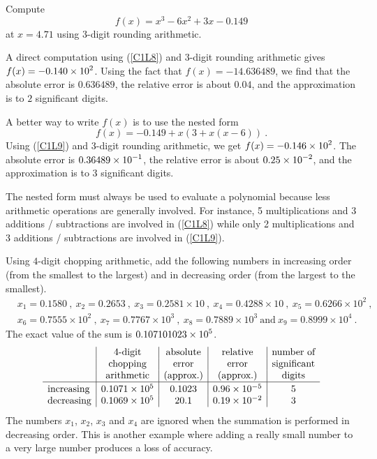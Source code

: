 \begin{egg}
Compute
\begin{equation} \label{C1L8}
f(x) = x^3 -6x^2+3x-0.149
\end{equation}
at $x=4.71$ using $3$-digit rounding arithmetic.

A direct computation using (\ref{C1L8}) and $3$-digit rounding
arithmetic gives $\displaystyle f(x) = -0.140 \times 10^2$.  Using the
fact that $f(x) = -14.636489$, we find that the absolute error is
$0.636489$, the relative error is about $0.04$, and the
approximation is to $2$ significant digits. 

A better way to write $f(x)$ is to use the nested form
\begin{equation} \label{C1L9}
f(x) = -0.149 +x(3 + x(x-6)) \ .
\end{equation}
Using (\ref{C1L9}) and $3$-digit rounding arithmetic, we get
$\displaystyle f(x) = -0.146 \times 10^2$.  The absolute error is
$\displaystyle 0.36489 \times 10^{-1}$, the relative error is about
$\displaystyle 0.25 \times 10^{-2}$, and the approximation is to $3$ significant
digits.

The nested form must always be used to evaluate a polynomial because
less arithmetic operations are generally involved.  For instance, 5
multiplications and 3 additions / subtractions are involved in
(\ref{C1L8}) while only 2 multiplications and 3
additions / subtractions are involved in (\ref{C1L9}).
\end{egg}

\begin{egg}
Using $4$-digit chopping arithmetic, add the following numbers in
increasing order (from the smallest to the largest) and in decreasing
order (from the largest to the smallest).
\begin{align*}
&x_1 = 0.1580 \ , \ x_2 = 0.2653 \ , \
x_3 = 0.2581 \times 10 \ , \ x_4 = 0.4288 \times 10 \ , \
x_5 = 0.6266 \times 10^2 \ , \\
&x_6 = 0.7555 \times 10^2 \ , \ x_7 = 0.7767 \times 10^3 \ ,
\ x_8 = 0.7889 \times 10^3 \ \text{and} \ x_9 = 0.8999 \times 10^4 \ .
\end{align*}
The exact value of the sum is $\displaystyle 0.107101023 \times 10^5$.
\[
\begin{array}{l|c|c|c|c}
& \text{$4$-digit} & \text{absolute} & \text{relative} & \text{number of} \\
& \text{chopping} & \text{error} & \text{error} & \text{significant} \\
& \text{arithmetic} & \text{(approx.)} & \text{(approx.)} & \text{digits} \\
\hline
\text{increasing} & \rule{0em}{1em} 0.1071\times 10^5 & 0.1023 &
0.96 \times 10^{-5} & 5 \\
\text{decreasing} & 0.1069\times 10^5 & 20.1 &
0.19 \times 10^{-2} & 3
\end{array}
\]
The numbers $x_1$, $x_2$, $x_3$ and $x_4$ are ignored when the summation is
performed in decreasing order.  This is another example where adding a really
small number to a very large number produces a loss of accuracy.
\end{egg}

